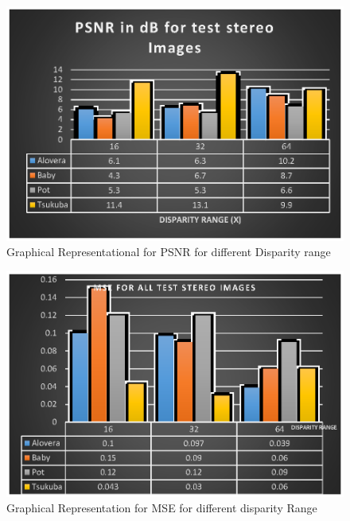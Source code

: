\documentclass{singlecol-new}
\theoremstyle{TH}{
\newtheorem{lemma}{Lemma}
\newtheorem{theorem}[lemma]{Theorem}
\newtheorem{corrolary}[lemma]{Corrolary}
\newtheorem{conjecture}[lemma]{Conjecture}
\newtheorem{proposition}[lemma]{Proposition}
\newtheorem{claim}[lemma]{Claim}
\newtheorem{stheorem}[lemma]{Wrong Theorem}
\newtheorem{algorithm}{Algorithm}
}
\theoremstyle{THrm}{
\newtheorem{definition}{Definition}[section]
\newtheorem{question}{Question}[section]
\newtheorem{remark}{Remark}
\newtheorem{scheme}{Scheme}
}
\theoremstyle{THhit}{
\newtheorem{case}{Case}[section]
}
\begin{document}
\begin{figure}
\includegraphics{psnrm.eps}
\caption{Graphical Representational for PSNR  for different Disparity range}\label{fig:editpublish}
\end{figure}
 \begin{figure}
\includegraphics{msem.eps}
\caption{Graphical Representation for MSE  for different disparity Range}
\end{figure}
\end{document}
